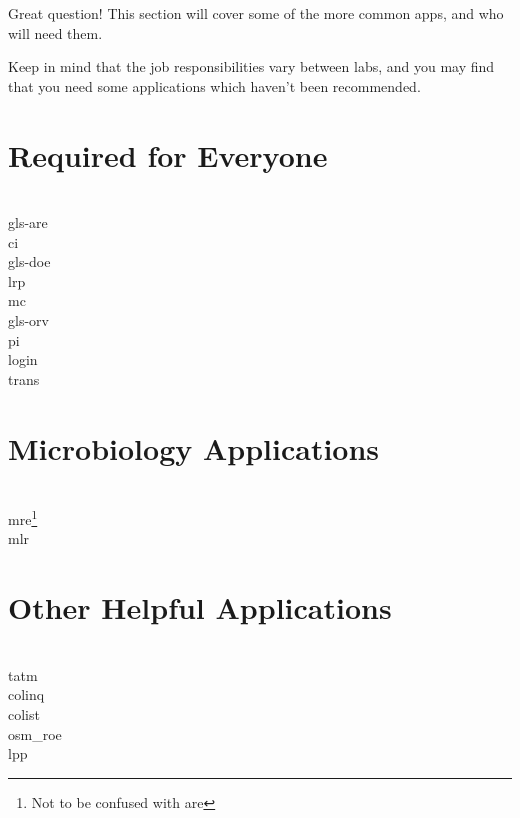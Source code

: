 Great question! This section will cover some of the more common apps, and who will need them.

Keep in mind that the job responsibilities vary between labs, and you may find that you need some applications which haven't been recommended.\\

\glsresetall
\section{Required for Everyone}
\noindent
    \begin{description}
            \\ \glsdesc{gls-are}
            \\ \glsdesc{ci}
            \\ \glsdesc{gls-doe}
            \\ \glsdesc{lrp}
            \\ \glsdesc{mc}
            \\ \glsdesc{gls-orv}
            \\ \glsdesc{pi}
            \\ \glsdesc{login}
            \\ \glsdesc{trans}
    \end{description}

\section{Microbiology Applications}
\noindent
    \begin{description}
        \\ \glsdesc{mre}\footnote{Not to be confused with \gls{are}}
        \\ \glsdesc{mlr}
    \end{description}

\section{Other Helpful Applications}
\noindent
    \begin{description}
            \\ \glsdesc{tatm}
            \\ \glsdesc{colinq}
            \\ \glsdesc{colist}
            \\ \glsdesc{osm_roe}
            \\ \glsdesc{lpp}
    \end{description}

